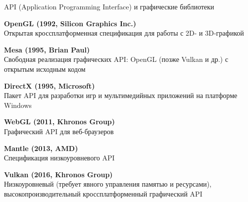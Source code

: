 \documentclass{beamer}
\begin{document}
\begin{frame}{API (Application Programming Interface) и графические библиотеки}

	{\small
		\textbf{OpenGL (1992, Silicon Graphics Inc.)} \\
		Открытая кроссплатформенная спецификация для работы с 2D- и 3D-графикой

		\textbf{Mesa (1995, Brian Paul)} \\
		Свободная реализация графических API: OpenGL (позже Vulkan и др.) с открытым исходным кодом

		\textbf{DirectX (1995, Microsoft)} \\
		Пакет API для разработки игр и мультимедийных приложений на платформе Windows

		\textbf{WebGL (2011, Khronos Group)} \\
		Графический API для веб-браузеров

		\textbf{Mantle (2013, AMD)} \\
		Спецификация низкоуровневого API

		\textbf{Vulkan (2016, Khronos Group)} \\
		Низкоуровневый (требует явного управления памятью и ресурсами), высокопроизводительный кроссплатформенный графический API
	}


\end{frame}
\end{document}
